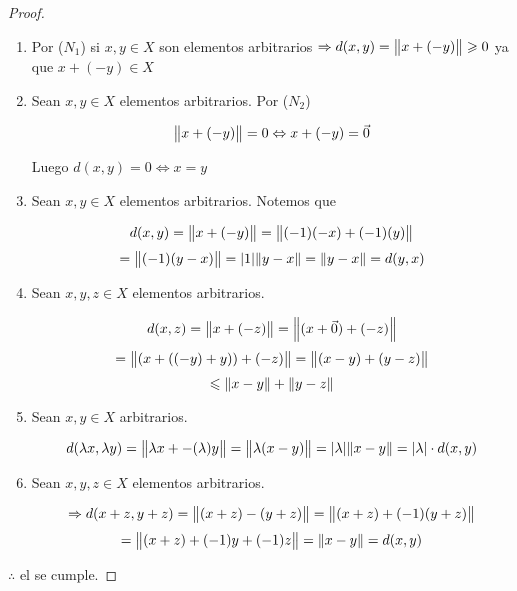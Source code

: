 \begin{proof}
    \begin{enumerate}[label=(\subscript{D}{{\arabic*}})]
    \item Por ($N_1$) si $x,y \in X$ son elementos arbitrarios $\Rightarrow d(x,y) = \norm{x+(-y)} \geqslant 0$ ya que $x+(-y) \in X$
    \item Sean $x,y \in X$ elementos arbitrarios. Por ($N_2$)

    \begin{equation*}
     \norm{x+(-y)} = 0 \Leftrightarrow x+(-y) = \vec{0}
    \end{equation*}

    Luego $d(x,y) = 0 \Leftrightarrow x=y$

    \item  Sean $x,y \in X$ elementos arbitrarios. Notemos que 

    \begin{equation*}
         d(x,y) = \norm{x+(-y)} = \norm{(-1)(-x)+(-1)(y)}
    \end{equation*}
    \begin{equation*}
         = \norm{(-1)(y-x)} = \abs{1} \norm{y-x} = \norm{y-x} = d(y,x)
    \end{equation*}

    \item Sean $x,y,z \in X$ elementos arbitrarios.

    \begin{equation*}
        d(x,z) = \norm{x+(-z)} = \norm{(x+\vec{0})+(-z)}
    \end{equation*}
    \begin{equation*}
        = \norm{(x+((-y)+y))+(-z)} = \norm{(x-y)+(y-z)}
    \end{equation*}
    \begin{equation*}
        \leqslant \norm{x-y} + \norm{y-z}
    \end{equation*}
    
    \item Sean $x,y \in X$ arbitrarios.

    \begin{equation*}
        d(\lambda x, \lambda y ) = \norm{\lambda x + -(\lambda)y} = \norm{\lambda(x-y)} = \abs{\lambda} \norm{x-y} = \abs{\lambda} \cdot d(x,y)
    \end{equation*}
    
    \item Sean $x,y,z \in X$ elementos arbitrarios.

    \begin{equation*}
        \Rightarrow d(x+z,y+z) = \norm{(x+z)-(y+z)} = \norm{(x+z)+(-1)(y+z)}
    \end{equation*}
    \begin{equation*}
        = \norm{(x+z)+(-1)y+(-1)z} = \norm{x-y} = d(x,y)
    \end{equation*}
    \end{enumerate}

    $\therefore$ el  se cumple.
\end{proof}


